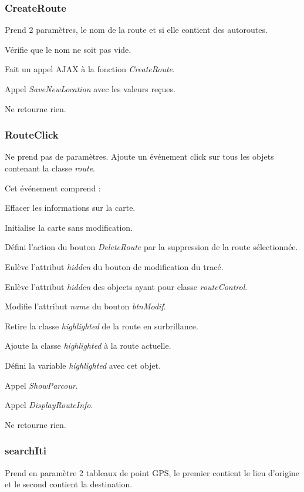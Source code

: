 \documentclass[a4paper]{article}
\newcommand{\diag}[1]{}
\begin{document}
\begin{center}
\diag{SaveNewRoute}
\end{center}

\subsubsection{CreateRoute}
Prend 2 paramètres, le nom de la route et si elle contient des autoroutes.

Vérifie que le nom ne soit pas vide.

Fait un appel AJAX à la fonction \emph{CreateRoute}.

Appel \emph{SaveNewLocation} avec les valeurs reçues.

Ne retourne rien.

\subsubsection{RouteClick}
Ne prend pas de paramètres.
Ajoute un événement click sur tous les objets contenant la classe \emph{route}.

Cet événement comprend :

Effacer les informations sur la carte.

Initialise la carte sans modification.

Défini l'action du bouton \emph{DeleteRoute} par la suppression de la route sélectionnée.

Enlève l'attribut \emph{hidden} du bouton de modification du tracé.

Enlève l'attribut \emph{hidden} des objects ayant pour classe \emph{routeControl}.

Modifie l'attribut \emph{name} du bouton \emph{btnModif}.

Retire la classe \emph{highlighted} de la route en surbrillance.

Ajoute la classe \emph{highlighted} à la route actuelle.

Défini la variable \emph{highlighted} avec cet objet.

Appel \emph{ShowParcour}.

Appel \emph{DisplayRouteInfo}.

Ne retourne rien.

\subsubsection{searchIti}
Prend en paramètre 2 tableaux de point GPS, le premier contient le lieu d'origine et le second contient la destination.
\end{document}
